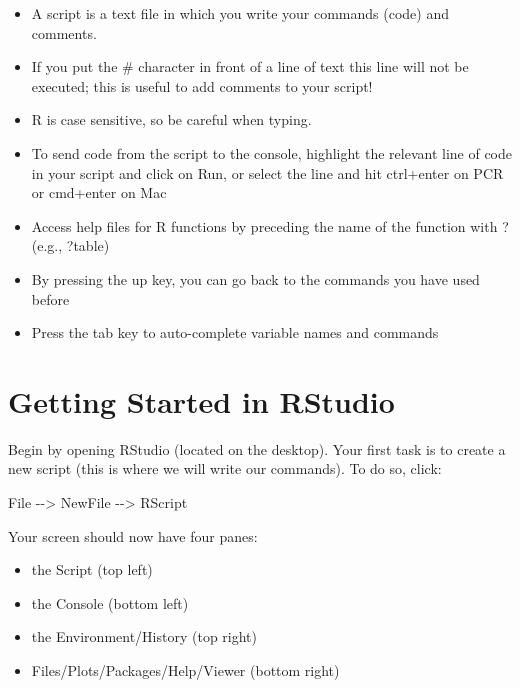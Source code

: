 \documentclass[
  letterpaper,
  DIV=11,
  numbers=noendperiod]{scrreprt}
\newenvironment{Shaded}{\begin{snugshade}}{\end{snugshade}}
\newcommand{\NormalTok}[1]{\textcolor[rgb]{0.00,0.23,0.31}{#1}}
\newcommand{\OtherTok}[1]{\textcolor[rgb]{0.00,0.23,0.31}{#1}}
\newcommand{\SpecialCharTok}[1]{\textcolor[rgb]{0.37,0.37,0.37}{#1}}
\begin{document}
\begin{itemize}
\item
  A script is a text file in which you write your commands (code) and
  comments.
\item
  If you put the \# character in front of a line of text this line will
  not be executed; this is useful to add comments to your script!
\item
  R is case sensitive, so be careful when typing.
\item
  To send code from the script to the console, highlight the relevant
  line of code in your script and click on Run, or select the line and
  hit ctrl+enter on PCR or cmd+enter on Mac
\item
  Access help files for R functions by preceding the name of the
  function with ? (e.g., ?table)
\item
  By pressing the up key, you can go back to the commands you have used
  before
\item
  Press the tab key to auto-complete variable names and commands
\end{itemize}

\hypertarget{getting-started-in-rstudio}{%
\section*{Getting Started in RStudio}\label{getting-started-in-rstudio}}

Begin by opening RStudio (located on the desktop). Your first task is to
create a new script (this is where we will write our commands). To do
so, click:

\begin{Shaded}
\begin{Highlighting}[]
\NormalTok{File }\SpecialCharTok{{-}}\OtherTok{{-}\textgreater{}}\NormalTok{ NewFile }\SpecialCharTok{{-}}\OtherTok{{-}\textgreater{}}\NormalTok{ RScript}
\end{Highlighting}
\end{Shaded}

Your screen should now have four panes:

\begin{itemize}
\item
  the Script (top left)
\item
  the Console (bottom left)
\item
  the Environment/History (top right)
\item
  Files/Plots/Packages/Help/Viewer (bottom right)
\end{itemize}
\end{document}
